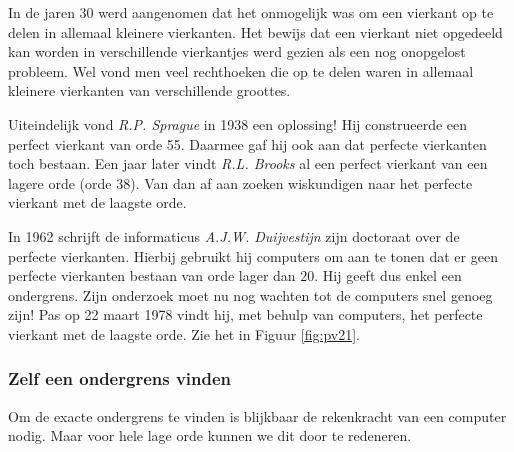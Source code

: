 In de jaren 30 werd aangenomen dat het onmogelijk was om een vierkant op te delen in allemaal kleinere vierkanten. Het bewijs dat een vierkant niet opgedeeld kan worden in verschillende vierkantjes werd gezien als een nog onopgelost probleem. Wel vond men veel rechthoeken die op te delen waren in allemaal kleinere vierkanten van verschillende groottes.

Uiteindelijk vond {\it R.P. Sprague} in 1938 een oplossing! Hij construeerde een perfect vierkant van orde 55. Daarmee gaf hij ook aan dat perfecte vierkanten toch bestaan. Een jaar later vindt {\it R.L. Brooks} al een perfect vierkant van een lagere orde (orde 38). Van dan af aan zoeken wiskundigen naar het perfecte vierkant met de laagste orde.

In 1962 schrijft de informaticus {\it A.J.W. Duijvestijn} zijn doctoraat over de perfecte vierkanten. Hierbij gebruikt hij computers om aan te tonen dat er geen perfecte vierkanten bestaan van orde lager dan $20$. Hij geeft dus enkel een ondergrens. Zijn onderzoek moet nu nog wachten tot de computers snel genoeg zijn! Pas op 22 maart 1978 vindt hij, met behulp van computers, het perfecte vierkant met de laagste orde. Zie het in Figuur \ref{fig:pv21}.

\subsubsection{Zelf een ondergrens vinden}

Om de exacte ondergrens te vinden is blijkbaar de rekenkracht van een computer nodig. Maar voor hele lage orde kunnen we dit door te redeneren.






